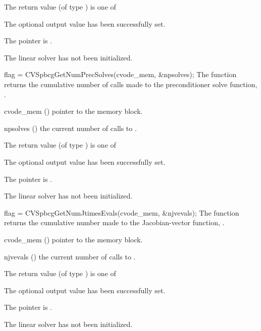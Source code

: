 {
  The return value  (of type ) is one of
  \begin{args}
  \item[\Id{CVSPBCG\_SUCCESS}] 
    The optional output value has been successfully set.
  \item[\Id{CVSPBCG\_MEM\_NULL}]
    The  pointer is .
  \item[\Id{CVSPBCG\_LMEM\_NULL}]
    The {\cvspbcg} linear solver has not been initialized.
  \end{args}
}
{}
{
  flag = CVSpbcgGetNumPrecSolves(cvode\_mem, \&npsolves);
}
{
  The function  returns the
  cumulative number of calls made to the preconditioner 
  solve function, .
}
{
  \begin{args}
  \item[cvode\_mem] ()
    pointer to the {\cvode} memory block.
  \item[npsolves] ()
    the current number of calls to .
  \end{args}
}
{
  The return value  (of type ) is one of
  \begin{args}
  \item[\Id{CVSPBCG\_SUCCESS}] 
    The optional output value has been successfully set.
  \item[\Id{CVSPBCG\_MEM\_NULL}]
    The  pointer is .
  \item[\Id{CVSPBCG\_LMEM\_NULL}]
    The {\cvspbcg} linear solver has not been initialized.
  \end{args}
}
{}
{
  flag = CVSpbcgGetNumJtimesEvals(cvode\_mem, \&njvevals);
}
{
  The function  returns the
  cumulative number made to the Jacobian-vector function,
  .
}
{
  \begin{args}
  \item[cvode\_mem] ()
    pointer to the {\cvode} memory block.
  \item[njvevals] ()
    the current number of calls to .
  \end{args}
}
{
  The return value  (of type ) is one of
  \begin{args}
  \item[\Id{CVSPBCG\_SUCCESS}] 
    The optional output value has been successfully set.
  \item[\Id{CVSPBCG\_MEM\_NULL}]
    The  pointer is .
  \item[\Id{CVSPBCG\_LMEM\_NULL}]
    The {\cvspbcg} linear solver has not been initialized.
  \end{args}
}
